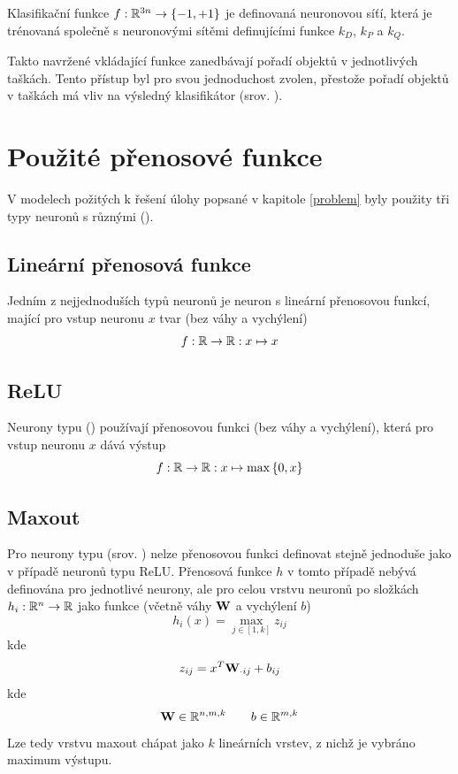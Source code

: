 Klasifikační funkce \( f : \mathbb R^{3n} \to \left\{ -1, +1 \right\} \) je definovaná neuronovou síťí, která je trénovaná společně s neuronovými sítěmi definujícími funkce \( k_D \), \( k_P \) a \( k_Q \).

Takto navržené vkládající funkce zanedbávají pořadí objektů v jednotlivých taškách. Tento přístup byl pro svou jednoduchost zvolen, přestože pořadí objektů v taškách má vliv na výsledný klasifikátor (srov. \cite{vinyals_order_2015}).

\section{Použité přenosové funkce}
V modelech požitých k řešení úlohy popsané v kapitole \ref{problem} byly použity tři typy neuronů s různými  ().

\subsection{Lineární přenosová funkce}
Jedním z nejjednoduších typů neuronů je neuron s lineární přenosovou funkcí, mající pro vstup neuronu \( x \) tvar (bez váhy a vychýlení)
\[ f : \mathbb R \to \mathbb R : x \mapsto x \]

\subsection{ReLU}
Neurony typu  () používají přenosovou funkci (bez váhy a vychýlení), která pro vstup neuronu \( x \) dává výstup
\[ f : \mathbb R \to \mathbb R : x \mapsto \max \left\{ 0, x \right\} \]

\subsection{Maxout}
Pro neurony typu  (srov. \cite{goodfellow_maxout_2013}) nelze přenosovou funkci definovat stejně jednoduše jako v případě neuronů typu ReLU. Přenosová funkce \( h \) v tomto případě nebývá definována pro jednotlivé neurony, ale pro celou vrstvu neuronů po složkách \( h_i : \mathbb R^n \to \mathbb R \) jako funkce (včetně váhy \( \mathbf W \) a vychýlení \( b \))
\[ h_i \left( x \right) = \max_{j \in \left[ 1, k \right]} z_{ij} \]
kde
\[ z_{ij} = x^T \mathbf W_{\cdot ij} + b_{ij} \]
kde
\[ \mathbf W \in \mathbb R^{n, m, k} \qquad b \in \mathbb R^{m, k} \]
Lze tedy vrstvu maxout chápat jako \( k \) lineárních vrstev, z nichž je vybráno maximum výstupu.

